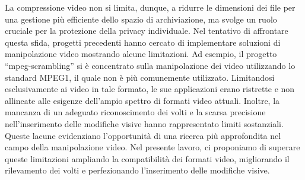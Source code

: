 \documentclass{report}
\begin{document}
La compressione video non si limita, dunque, a ridurre le dimensioni dei file per una gestione più efficiente dello spazio di archiviazione, ma svolge un ruolo cruciale per la protezione della privacy individuale. Nel tentativo di affrontare questa sfida, progetti precedenti hanno cercato di implementare soluzioni di manipolazione video mostrando alcune limitazioni. Ad esempio, il progetto “mpeg-scrambling” si è concentrato sulla manipolazione dei video utilizzando lo standard MPEG1, il quale non è più comunemente utilizzato. Limitandosi esclusivamente ai video in tale formato, le sue applicazioni erano ristrette e non allineate alle esigenze dell’ampio spettro di formati video attuali. Inoltre, la mancanza di un adeguato riconoscimento dei volti e la scarsa precisione nell’inserimento delle modifiche visive hanno rappresentato limiti sostanziali. Queste lacune evidenziano l’opportunità di una ricerca più approfondita nel campo della manipolazione video. Nel presente lavoro, ci proponiamo di superare queste limitazioni ampliando la compatibilità dei formati video, migliorando il rilevamento dei volti e perfezionando l’inserimento delle modifiche visive.
\end{document}
